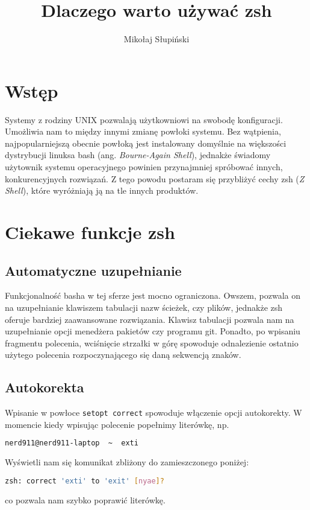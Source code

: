 \documentclass[a4paper]{article}
\title{Dlaczego warto używać zsh}
\author{Mikołaj Słupiński}
\begin{document}
\maketitle

\section{Wstęp}

Systemy z rodziny UNIX pozwalają użytkowniowi na swobodę konfiguracji. Umożliwia nam to między innymi zmianę  powłoki systemu. Bez wątpienia, najpopularniejszą obecnie powłoką jest instalowany domyślnie na większości dystrybucji linuksa bash (ang. \emph{Bourne-Again Shell}), jednakże świadomy użytownik systemu operacyjnego powinien przynajmniej spróbować innych, konkurencyjnych rozwiązań. Z tego powodu postaram się przybliżyć cechy zsh (\emph{Z Shell}), które wyróżniają ją na tle innych produktów.

\section{Ciekawe funkcje zsh}

\subsection{Automatyczne uzupełnianie}
Funkcjonalność basha w tej sferze jest mocno ograniczona. Owszem, pozwala on na uzupełnianie klawiszem tabulacji nazw ścieżek, czy plików, jednakże zsh oferuje bardziej zaawansowane rozwiązania. Klawisz tabulacji pozwala nam na uzupełnianie opcji menedżera pakietów czy programu git. Ponadto, po wpisaniu fragmentu polecenia, wciśnięcie strzałki w górę spowoduje odnalezienie ostatnio użytego polecenia rozpoczynającego się daną sekwencją znaków.

\subsection{Autokorekta}
Wpisanie w powłoce \texttt{setopt correct} spowoduje włączenie opcji autokorekty. W momencie kiedy wpisując polecenie popełnimy literówkę, np.
\begin{lstlisting}[language=bash]
nerd911@nerd911-laptop  ~  exti
\end{lstlisting}
Wyświetli nam się komunikat zbliżony do zamieszczonego poniżej:
\begin{lstlisting}[language=bash]
zsh: correct 'exti' to 'exit' [nyae]?
\end{lstlisting}
co pozwala nam szybko poprawić literówkę.
\end{document}
